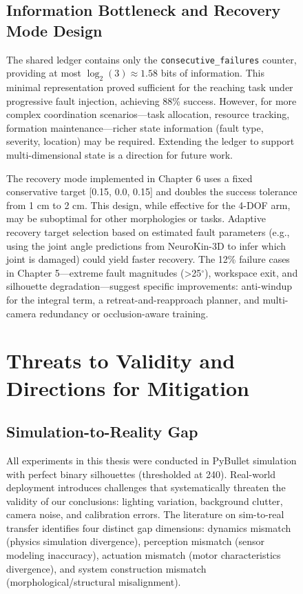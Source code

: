 \documentclass[12pt,a4paper,oneside]{report}
\begin{document}
\begin{figure}[H]
\subsection{Information Bottleneck and Recovery Mode Design}

The shared ledger contains only the \texttt{consecutive\_failures} counter, providing at most $\log_2(3) \approx 1.58$ bits of information. This minimal representation proved sufficient for the reaching task under progressive fault injection, achieving 88\% success. However, for more complex coordination scenarios---task allocation, resource tracking, formation maintenance---richer state information (fault type, severity, location) may be required. Extending the ledger to support multi-dimensional state is a direction for future work.

The recovery mode implemented in Chapter 6 uses a fixed conservative target [0.15, 0.0, 0.15] and doubles the success tolerance from 1 cm to 2 cm. This design, while effective for the 4-DOF arm, may be suboptimal for other morphologies or tasks. Adaptive recovery target selection based on estimated fault parameters (e.g., using the joint angle predictions from NeuroKin-3D to infer which joint is damaged) could yield faster recovery. The 12\% failure cases in Chapter 5---extreme fault magnitudes (>25$^\circ$), workspace exit, and silhouette degradation---suggest specific improvements: anti-windup for the integral term, a retreat-and-reapproach planner, and multi-camera redundancy or occlusion-aware training.

\section{Threats to Validity and Directions for Mitigation}

\subsection{Simulation-to-Reality Gap}

All experiments in this thesis were conducted in PyBullet simulation with perfect binary silhouettes (thresholded at 240). Real-world deployment introduces challenges that systematically threaten the validity of our conclusions: lighting variation, background clutter, camera noise, and calibration errors. The literature on sim-to-real transfer \cite{tan2018simtoreal, aljalbout2026realitygap} identifies four distinct gap dimensions: dynamics mismatch (physics simulation divergence), perception mismatch (sensor modeling inaccuracy), actuation mismatch (motor characteristics divergence), and system construction mismatch (morphological/structural misalignment).


\end{figure}
\end{document}

